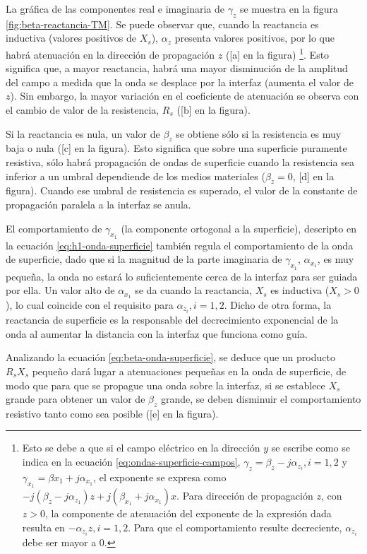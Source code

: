 La gráfica de las componentes real e imaginaria de $\gamma_z$ se muestra en la figura \ref{fig:beta-reactancia-TM}. Se puede observar que, cuando la reactancia es inductiva (valores positivos de $X_s$), $\alpha_z$ presenta valores positivos, por lo que habrá atenuación en la dirección de propagación $z$ ([a] en la figura) \footnote{Esto se debe a que si el campo eléctrico en la dirección $y$ se escribe como se indica en la ecuación \ref{eq:ondas-superficie-campos}, $\gamma_z=\beta_z-j\alpha_{z_i}, i=1,2$ y $\gamma_{x_1} = \beta{x_1}+j\alpha_{x_1}$, el exponente se expresa como $-j(\beta_z-j\alpha_{z_1})z + j(\beta_{x_1}+j\alpha_{x_1})x$. Para dirección de propagación $z$, con $z>0$, la componente de atenuación del exponente de la expresión dada resulta en $-\alpha_{z_i} z, i=1,2$. Para que el comportamiento resulte decreciente, $\alpha_{z_i}$ debe ser mayor a $0$.}. Esto significa que, a mayor reactancia, habrá una mayor disminución de la amplitud del campo a medida que la onda se desplace por la interfaz (aumenta el valor de $z$). Sin embargo, la mayor variación en el coeficiente de atenuación se observa con el cambio de valor de la resistencia, $R_s$ ([b] en la figura).

Si la reactancia es nula, un valor de $\beta_z$ se obtiene sólo si la resistencia es muy baja o nula ([c] en la figura). Esto significa que sobre una superficie puramente resistiva, sólo habrá propagación de ondas de superficie cuando la resistencia sea inferior a un umbral dependiende de los medios materiales ($\beta_z=0$, [d] en la figura). Cuando ese umbral de resistencia es superado, el valor de la constante de propagación paralela a la interfaz se anula.

El comportamiento de $\gamma_{x_1}$ (la componente ortogonal a la superficie), descripto en la ecuación \ref{eq:h1-onda-superficie} también regula el comportamiento de la onda de superficie, dado que si la magnitud de la parte imaginaria de $\gamma_{x_1}$, $\alpha_{x_1}$, es muy pequeña, la onda no estará lo suficientemente cerca de la interfaz para ser guiada por ella. Un valor alto de $\alpha_{x_1}$ se da cuando la reactancia, $X_s$ es inductiva ($X_s>0$), lo cual coincide con el requisito para $\alpha_{z_i}, i=1,2$. Dicho de otra forma, la reactancia de superficie es la responsable del decrecimiento exponencial de la onda al aumentar la distancia con la interfaz que funciona como guía.

Analizando la ecuación \ref{eq:beta-onda-superficie}, se deduce que un producto $R_s X_s$ pequeño dará lugar a atenuaciones pequeñas en la onda de superficie, de modo que para que se propague una onda sobre la interfaz, si se establece $X_s$ grande para obtener un valor de $\beta_z$ grande, se deben disminuir el comportamiento resistivo tanto como sea posible ([e] en la figura).

